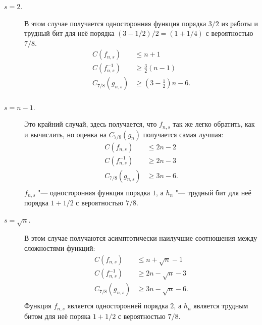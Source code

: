 \documentclass[a4paper, 14pt]{extarticle}
\begin{document}
\begin{description}
\item[$s = 2$.] В этом случае получается односторонняя функция порядка $3/2$ из
работы \cite{hiltgen1993} и трудный бит для неё порядка $(3 - 1/2) / 2 = (1 +
1/4)$ с вероятностью $7/8$.
\[
\begin{aligned}
C(f_{n, s}) &\leq n + 1 \\
C(f_{n, s}^{-1}) &\geq \frac 3 2 (n - 1) \\
C_{7/8}(g_{n, s}) &\geq (3 - \frac 1 2)n - 6. \\
\end{aligned}
\]
\item[$s = n - 1$.] Это крайний случай, здесь получается, что $f_{n, s}$ так же
легко обратить, как и вычислить, но оценка на $C_{7/8}(g_n)$ получается самая
лучшая:
\[
\begin{aligned}
C(f_{n, s}) &\leq 2n - 2 \\
C(f_{n, s}^{-1}) &\geq 2n - 3 \\
C_{7/8}(g_{n, s}) &\geq 3n - 6. \\
\end{aligned}
\]
$f_{n,s}$ "--- односторонняя функция порядка $1$, а $h_{n}$ "--- трудный бит для
неё порядка $1 + 1/2$ с вероятностью $7/8$.
\item[$s = \sqrt{n}$.] В этом случае получаются асимптотически наилучшие
соотношения между сложностями функций:
\[
\begin{aligned}
C(f_{n, s}) &\leq n + \sqrt{n} - 1 \\
C(f_{n, s}^{-1}) &\geq 2n - \sqrt n - 3 \\
C_{7/8}(g_{n, s}) &\geq 3n - \sqrt{n} - 6. \\
\end{aligned}
\]
Функция $f_{n, s}$ является односторонней порядка $2$, а $h_{n}$ является
трудным битом для неё поряка $1 + 1/2$ с вероятностью $7/8$.
\end{description}

{}

\end{document}

